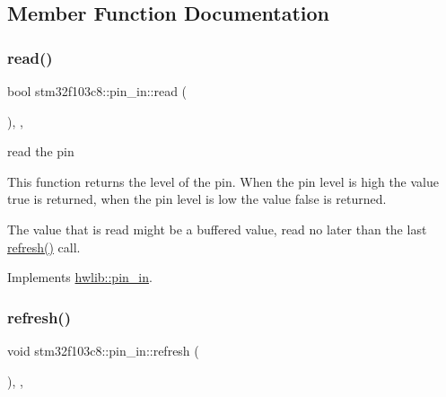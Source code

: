 \subsection{Member Function Documentation}
\mbox{\label{classstm32f103c8_1_1pin__in_aba2e7e6efa14b83d12c30b63f67b9270}} 
\subsubsection{\texorpdfstring{read()}{read()}}
{\footnotesize\ttfamily bool stm32f103c8\+::pin\+\_\+in\+::read (\begin{DoxyParamCaption}{ }\end{DoxyParamCaption})\hspace{0.3cm}{\ttfamily [inline]}, {\ttfamily [override]}, {\ttfamily [virtual]}}





read the pin

This function returns the level of the pin. When the pin level is high the value true is returned, when the pin level is low the value false is returned.

The value that is read might be a buffered value, read no later than the last \hyperlink{classstm32f103c8_1_1pin__in_a9942b1766a4c01d0efcbe893bcd7b62f}{refresh()} call. 

Implements \hyperlink{classhwlib_1_1pin__in_ad071bd2e17bb4af51390f6cbb728a194}{hwlib\+::pin\+\_\+in}.

\mbox{\label{classstm32f103c8_1_1pin__in_a9942b1766a4c01d0efcbe893bcd7b62f}} 
\subsubsection{\texorpdfstring{refresh()}{refresh()}}
{\footnotesize\ttfamily void stm32f103c8\+::pin\+\_\+in\+::refresh (\begin{DoxyParamCaption}{ }\end{DoxyParamCaption})\hspace{0.3cm}{\ttfamily [inline]}, {\ttfamily [override]}, {\ttfamily [virtual]}}





